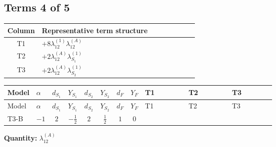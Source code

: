 \documentclass[8pt]{article}
\begin{document}
\begin{landscape}
\subsection*{Terms 4 of 5}
\begin{center}
\begin{tabular}{@{}c >{\raggedright\arraybackslash}p{0.82\linewidth}@{}}
\toprule
Column & Representative term structure \\
\midrule
T1 & \(\displaystyle +8 {\lambda_{12}^{(1)}} {\lambda_{12}^{(A)}}\) \\
\midrule
T2 & \(\displaystyle +2 {\lambda_{12}^{(A)}} {\lambda_{S_1}^{(1)}}\) \\
\midrule
T3 & \(\displaystyle +2 {\lambda_{12}^{(A)}} {\lambda_{S_2}^{(1)}}\) \\
\midrule
\bottomrule
\end{tabular}
\end{center}
\smallskip
\tiny
\begin{longtable}{@{}llcccccc >{\raggedright\arraybackslash}p{0.21\linewidth} >{\raggedright\arraybackslash}p{0.21\linewidth} >{\raggedright\arraybackslash}p{0.21\linewidth}@{}}
\toprule
Model & $\alpha$ & $d_{S_1}$ & $Y_{S_1}$ & $d_{S_2}$ & $Y_{S_2}$ & $d_F$ & $Y_F$ & T1 & T2 & T3 \\
\midrule
\endfirsthead
\toprule
Model & $\alpha$ & $d_{S_1}$ & $Y_{S_1}$ & $d_{S_2}$ & $Y_{S_2}$ & $d_F$ & $Y_F$ & T1 & T2 & T3 \\
\midrule
\endhead
T3-B & $-1$ & $2$ & $-\frac{1}{2}$ & $2$ & $\frac{1}{2}$ & $1$ & $0$ & \scriptsize\adjustbox{max width=\linewidth}{$\begin{gathered} +8 {\lambda_{12}^{(1)}} {\lambda_{12}^{(A)}}\end{gathered}$} & \scriptsize\adjustbox{max width=\linewidth}{$\begin{gathered} +2 {\lambda_{12}^{(A)}} {\lambda_{S_1}^{(1)}}\end{gathered}$} & \scriptsize\adjustbox{max width=\linewidth}{$\begin{gathered} +2 {\lambda_{12}^{(A)}} {\lambda_{S_2}^{(1)}}\end{gathered}$} \\
\midrule
\bottomrule
\end{longtable}
\clearpage
\noindent\textbf{Quantity: }$\lambda_{12}^{(A)}$\par\smallskip

\end{landscape}
\end{document}

